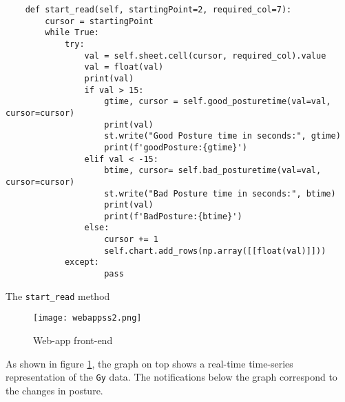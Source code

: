 \documentclass[./main.tex]{subfiles}
\begin{document}
\begin{code}
    \begin{verbatim}
    def start_read(self, startingPoint=2, required_col=7):
        cursor = startingPoint
        while True:
            try:
                val = self.sheet.cell(cursor, required_col).value
                val = float(val)
                print(val)
                if val > 15:
                    gtime, cursor = self.good_posturetime(val=val, cursor=cursor)
                    print(val)
                    st.write("Good Posture time in seconds:", gtime)
                    print(f'goodPosture:{gtime}')
                elif val < -15:
                    btime, cursor= self.bad_posturetime(val=val, cursor=cursor)
                    st.write("Bad Posture time in seconds:", btime)
                    print(val)
                    print(f'BadPosture:{btime}')
                else:
                    cursor += 1
                    self.chart.add_rows(np.array([[float(val)]]))
            except:
                    pass
    \end{verbatim}
    \caption{The \texttt{start_read} method}
    \label{code:start_read}
\end{code}

\begin{figure}[H]
    \centering
    \texttt{[image: webappss2.png]}
    \caption{Web-app front-end}
    \label{fig:webapp}
\end{figure}

As shown in figure \ref{fig:webapp}, the graph on top shows a real-time
time-series representation of the \texttt{Gy} data. The notifications below the
graph correspond to the changes in posture.
\end{document}

